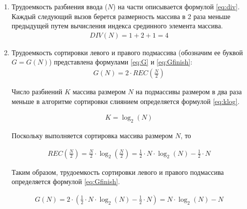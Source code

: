\begin{enumerate}[label={\arabic*)}]
	\item Трудоемкость разбиения ввода ($N$) на части описывается формулой \ref{eq:div}. 
	Каждый следующий вызов берется размерность массива в 2 раза меньше предыдущей путем вычисления индекса срединного элемента массива.
	\begin{equation}
		\label{eq:div}
		\begin{gathered}
			DIV(N) = 1 + 2 + 1 = 4
		\end{gathered}
	\end{equation}
	\item Трудоемкость сортировки левого и правого подмассива (обозначим ее буквой $G = G(N)$) представлена формулами \ref{eq:G} и \ref{eq:Gfinish}:
	\begin{equation}
		\label{eq:G}
		\begin{gathered}
			G(N) = 2 \cdot REC(\frac{N}{2})
		\end{gathered}
	\end{equation}
	
	Число разбиений $K$ массива размером $N$ на подмассивы размером в два раза меньше в алгоритме сортировки слиянием определяется формулой \ref{eq:klog}.
	
	\begin{equation}
		\label{eq:klog}
		\begin{gathered}
			K = \log_2(N)
		\end{gathered}
	\end{equation}

	Поскольку выполняется сортировка массива размером $N$, то 
	
	\begin{equation}
		\begin{gathered}
			REC(\frac{N}{2}) = \frac{N}{2} \cdot \log_2(\frac{N}{2}) = \frac{1}{2} \cdot N \cdot \log_2(N) - \frac{1}{2} \cdot N
		\end{gathered}
	\end{equation}
	
	Таким образом, трудоемкость сортировки левого и правого подмассива определяется формулой \ref{eq:Gfinish}.
	
	\begin{equation}
		\label{eq:Gfinish}
		\begin{gathered}
			G(N) = 2 \cdot (\frac{1}{2} \cdot N \cdot \log_2(N) - \frac{1}{2} \cdot N) = N \cdot \log_2(N) - N
		\end{gathered}
	\end{equation}
	

\end{enumerate}
